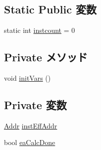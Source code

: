 \subsection*{Static Public 変数}
\begin{DoxyCompactItemize}
\item 
static int \hyperlink{classInOrderDynInst_a19e374b98940ff65bd4d9d17f198738c}{instcount} = 0
\end{DoxyCompactItemize}
\subsection*{Private メソッド}
\begin{DoxyCompactItemize}
\item 
void \hyperlink{classInOrderDynInst_a1b19937d8cca25bf52a51ae7de67ea94}{initVars} ()
\end{DoxyCompactItemize}
\subsection*{Private 変数}
\begin{DoxyCompactItemize}
\item 
\hyperlink{base_2types_8hh_af1bb03d6a4ee096394a6749f0a169232}{Addr} \hyperlink{classInOrderDynInst_aaa54d2440fad0984a0a8edbcade8c26f}{instEffAddr}
\item 
bool \hyperlink{classInOrderDynInst_a4c89b34e605b9d5398d51e8d754035de}{eaCalcDone}
\end{DoxyCompactItemize}


